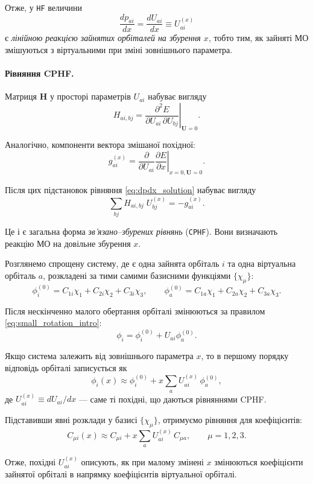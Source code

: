 Отже, у \texttt{HF} величини
\[
	\frac{dp_{ai}}{dx}
	=
	\frac{dU_{ai}}{dx}
	\equiv U_{ai}^{(x)}
\]
є \emph{лінійною реакцією зайнятих орбіталей на збурення $x$},
тобто тим, як зайняті МО змішуються з віртуальними при зміні зовнішнього параметра.

\paragraph{Рівняння CPHF.}
Матриця $\mathbf H$ у просторі параметрів $U_{ai}$ набуває вигляду
\begin{equation}\label{eq:H_ai_bj_def}
	H_{ai,bj}
	=
	\left.\frac{\partial^2 E}{\partial U_{ai}\,\partial U_{bj}}\right|_{\mathbf U= 0}.
\end{equation}

Аналогічно, компоненти вектора змішаної похідної:
\begin{equation}\label{eq:g_ai_def}
	g_{ai}^{(x)}
	=
	\frac{\partial }{\partial U_{ai}}\left.\frac{\partial E}{\partial x}\right|_{x = 0, \mathbf U= 0}.
\end{equation}

Після цих підстановок рівняння \eqref{eq:dpdx_solution} набуває вигляду
\begin{equation}\label{eq:CPHF_matrix_general}
	\sum_{b j} H_{ai,bj}\;U_{bj}^{(x)} = -g_{ai}^{(x)}.
\end{equation}

Це і є загальна форма \emph{зв'язано--збурених рівнянь} (\texttt{CPHF}).
Вони визначають реакцію МО на довільне збурення $x$.

\begin{commentbox}[Приклад]
	Розглянемо спрощену систему, де є одна зайнята орбіталь $i$ та одна
	віртуальна орбіталь $a$, розкладені за тими самими базисними функціями
	$\{\chi_\mu\}$:
	\[
		\phi_i^{(0)} = C_{1i}\chi_1 + C_{2i}\chi_2 + C_{3i}\chi_3,\qquad
		\phi_a^{(0)} = C_{1a}\chi_1 + C_{2a}\chi_2 + C_{3a}\chi_3.
	\]

	Після нескінченно малого обертання орбіталі змінюються за правилом
	\eqref{eq:small_rotation_intro}:
	\[
		\phi_i = \phi_i^{(0)} + U_{ai}\phi_a^{(0)}.
	\]

	Якщо система залежить від зовнішнього параметра $x$, то в першому порядку відповідь орбіталі записується як
	\[
		\phi_i(x) \approx \phi_i^{(0)} + x\sum_a U_{ai}^{(x)}\,\phi_a^{(0)},
	\]
	де $U_{ai}^{(x)}\equiv dU_{ai}/dx$ — саме ті похідні, що даються рівняннями CPHF.

	Підставивши явні розклади у базисі $\{\chi_\mu\}$, отримуємо рівняння для коефіцієнтів:
	\[
		C_{\mu i}(x) \approx C_{\mu i} + x\sum_a U_{ai}^{(x)}\,C_{\mu a},
		\qquad \mu=1,2,3.
	\]

	Отже, похідні $U_{ai}^{(x)}$ описують, як при малому змінені $x$ змінюються
	коефіцієнти зайнятої орбіталі в напрямку коефіцієнтів віртуальної орбіталі.
\end{commentbox}



